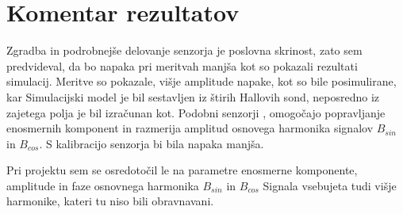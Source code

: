 \section{Komentar rezultatov}
Zgradba in podrobnejše delovanje senzorja je poslovna skrinost, zato sem predvideval, da bo napaka pri meritvah manjša kot so pokazali rezultati simulacij. Meritve so pokazale, višje amplitude napake, kot so bile posimulirane, kar  Simulacijski model je bil sestavljen iz štirih Hallovih sond, neposredno iz zajetega polja je bil izračunan kot. 
Podobni senzorji \cite{iCMHM}, omogočajo popravljanje enosmernih komponent in razmerija amplitud osnovega harmonika signalov  $B_{sin}$ in $B_{cos}$. S kalibracijo senzorja bi bila napaka manjša.

Pri projektu sem se osredotočil le na parametre enosmerne komponente, amplitude in faze osnovnega harmonika  $B_{sin}$ in $B_{cos}$ Signala vsebujeta tudi višje harmonike, kateri tu niso bili obravnavani.



